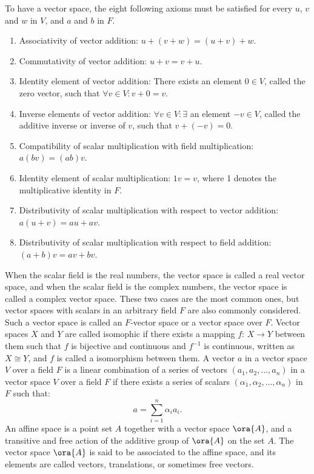 \documentclass[a4paper,12pt]{article}
\begin{document}
To have a vector space, the eight following axioms must be satisfied for every $u$, $v$ and $w$ in $V$, and $a$ and $b$ in $F$.
\begin{enumerate}
\item Associativity of vector addition: $u + (v + w) = (u + v) + w$.
\item Commutativity of vector addition: $u + v = v + u$.
\item Identity element of vector addition: There exists an element $ 0 \in V$, called the zero vector, such that $\forall v\in V\colon v+ 0=v$.
\item Inverse elements of vector addition: $\forall v\in V\colon \exists$ an element $-v\in V$, called the additive inverse or inverse of $v$, such that $v + (−v) = 0$.
\item Compatibility of scalar multiplication with field multiplication: $a(bv) = (ab)v$.
\item Identity element of scalar multiplication: $1v = v$, where 1 denotes the multiplicative identity in $F$.
\item Distributivity of scalar multiplication with respect to vector addition: $a(u + v) = au + av$.
\item Distributivity of scalar multiplication with respect to field addition: $(a + b)v = av + bv$.
\end{enumerate}
When the scalar field is the real numbers, the vector space is called a real vector space, and when the scalar field is the complex numbers, the vector space is called a complex vector space. These two cases are the most common ones, but vector spaces with scalars in an arbitrary field $F$ are also commonly considered. Such a vector space is called an $F$-vector space or a vector space over $F$.
Vector spaces $X$ and $Y$ are called isomophic if there exists a mapping $f:\,X\to Y$ between them such that $f$ is bijective and continuous and $f^{-1}$ is continuous, written as \( X \cong Y \), and $f$ is called a isomorphism between them.
A vector $a$ in a vector space $V$ over a field $F$ is a linear combination of a series of vectors $(a_1,a_2,\ldots,a_n)$ in a vector space $V$ over a field $F$ if there exists a series of scalars $(\alpha_1,\alpha_2,\ldots,\alpha_n)$ in $F$ such that:
\[a=\sum_{i=1}^n\alpha_ia_i.\]
An affine space is a point set $A$ together with a vector space $\ora{A}$, and a transitive and free action of the additive group of $\ora{A}$ on the set $A$. The vector space $\ora{A}$ is said to be associated to the affine space, and its elements are called vectors, translations, or sometimes free vectors.
\end{document}
